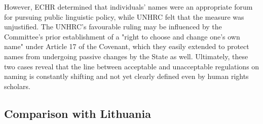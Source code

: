 However, ECHR determined that individuals' names were an appropriate forum for pursuing public linguistic policy, while UNHRC felt that the measure was unjustified. The UNHRC's favourable ruling may be influenced by the Committee's prior establishment of a "right to choose and change one's own name" under Article 17 of the Covenant, which they easily extended to protect names from undergoing passive changes by the State as well. Ultimately, these two cases reveal that the line between acceptable and unacceptable regulations on naming is constantly shifting and not yet clearly defined even by human rights scholars.

\subsection{Comparison with Lithuania}
